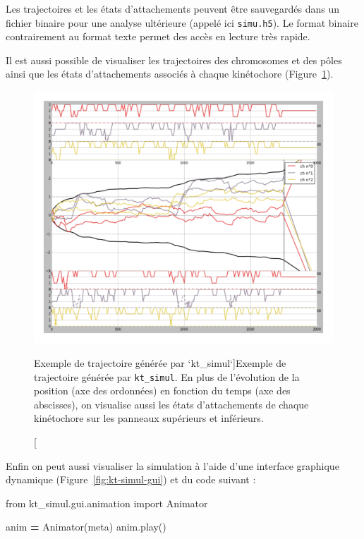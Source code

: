 \documentclass[12pt,a4paper,twoside,openright]{book}
\newenvironment{Shaded}{\begin{snugshade}}{\end{snugshade}}
\newcommand{\ImportTok}[1]{{#1}}
\newcommand{\OperatorTok}[1]{\textcolor[rgb]{0.81,0.36,0.00}{\textbf{{#1}}}}
\newcommand{\NormalTok}[1]{{#1}}
\begin{document}
Les trajectoires et les états d'attachements peuvent être sauvegardés
dans un fichier binaire pour une analyse ultérieure (appelé ici
\texttt{simu.h5}). Le format binaire contrairement au format texte
permet des accès en lecture très rapide.

Il est aussi possible de visualiser les trajectoires des chromosomes et
des pôles ainsi que les états d'attachements associés à chaque
kinétochore (Figure~\ref{fig:kt-simul-traj}).

\begin{figure}[htbp]
\centering
\includegraphics{figures/annexes/trajectories.png}
\caption[Exemple de trajectoire générée par `kt\_simul`]{\label{fig:kt-simul-traj}Exemple
de trajectoire générée par \texttt{kt\_simul}. En plus de l'évolution de
la position (axe des ordonnées) en fonction du temps (axe des
abscisses), on visualise aussi les états d'attachements de chaque
kinétochore sur les panneaux supérieurs et inférieurs.}
\end{figure}

Enfin on peut aussi visualiser la simulation à l'aide d'une interface
graphique dynamique (Figure~\ref{fig:kt-simul-gui}) et du code suivant :

\begin{Shaded}
\begin{Highlighting}[]
\ImportTok{from} \NormalTok{kt_simul.gui.animation }\ImportTok{import} \NormalTok{Animator}

\NormalTok{anim }\OperatorTok{=} \NormalTok{Animator(meta)}
\NormalTok{anim.play()}
\end{Highlighting}
\end{Shaded}
\end{document}
